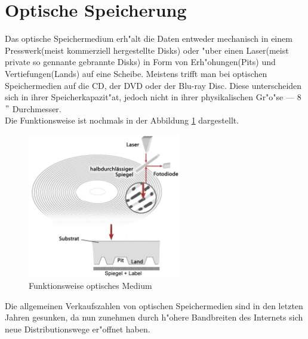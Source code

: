    
    \section{Optische Speicherung}
    \label{ch:Technisch:sec:Optische Speicherung}
    
        Das optische Speichermedium erh"alt die Daten entweder mechanisch in einem Presswerk(meist kommerziell hergestellte Disks) oder "uber einen Laser(meist private so gennante \glqq gebrannte\grqq{} Disks) in Form von Erh"ohungen(Pits) und Vertiefungen(Lands) auf eine Scheibe. Meistens trifft man bei optischen Speichermedien auf die CD, der DVD oder der Blu-ray Disc. Diese unterscheiden sich in ihrer Speicherkapazit"at, jedoch nicht in ihrer physikalischen Gr"o"se --- 8$"$ Durchmesser.
        \\
		Die Funktionsweise ist nochmals in der Abbildung \ref{fig:cd} dargestellt.
		
		\begin{figure}[ht]
				\centering
				\includegraphics[width=0.6\textwidth]{images/cd} 
				\caption[Funktionsweise optisches Medium \cite{fig:cd}]{Funktionsweise optisches Medium}
				\label{fig:cd}
				\end{figure}
				
        Die allgemeinen Verkaufszahlen von optischen Speichermedien sind in den letzten Jahren gesunken, da nun zunehmen durch h"ohere Bandbreiten des Internets sich neue Distributionswege er"offnet haben.
		

